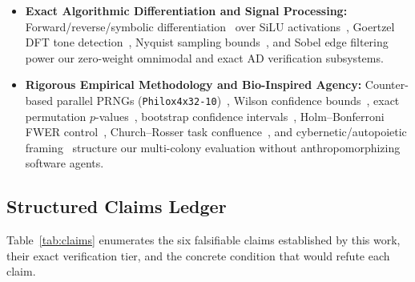 \documentclass[11pt,letterpaper]{amsart}
\newcommand{\code}[1]{{\small\texttt{#1}}}
\begin{document}
\begin{itemize}
  (\code{QGT}) and topological Chern/SSH/Kitaev
  invariants~\cite{provost1980riemannian,qi2006topological,su1979solitons,kitaev2001unpaired},
  spherical-harmonic Uns\"old identities~\cite{unsold1927beitraege}, physics-informed
  networks~\cite{raissi2019pinn}, Fibonacci anyon braiding~\cite{nayak2008nonabelian},
  spintronic $p$-bit Ising hardware models~\cite{camsari2017stochastic}, and
  QUBO simulated annealing~\cite{kirkpatrick1983optimization,glover2019qubo,lucas2014ising}.
  \item \textbf{Exact Algorithmic Differentiation and Signal Processing:}
  Forward/reverse/symbolic differentiation~\cite{baydin2018automatic,griewank2008evaluating}
  over SiLU activations~\cite{elfwing2018sigmoid}, Goertzel DFT tone
  detection~\cite{goertzel1958algorithm}, Nyquist sampling
  bounds~\cite{nyquist1928certain}, and Sobel edge filtering~\cite{kanopoulos1988sobel}
  power our zero-weight omnimodal and exact AD verification subsystems.
  \item \textbf{Rigorous Empirical Methodology and Bio-Inspired Agency:}
  Counter-based parallel PRNGs (\code{Philox4x32-10})~\cite{salmon2011parallel},
  Wilson confidence bounds~\cite{wilson1927probable}, exact permutation
  $p$-values~\cite{phipson2010permutation}, bootstrap confidence
  intervals~\cite{efron1979bootstrap}, Holm--Bonferroni FWER
  control~\cite{holm1979simple}, Church--Rosser task
  confluence~\cite{church1936conversion}, and cybernetic/autopoietic
  framing~\cite{varela1974autopoiesis,levin2022tame} structure our multi-colony
  evaluation without anthropomorphizing software agents.
\end{itemize}

\subsection{Structured Claims Ledger}
Table~\ref{tab:claims} enumerates the six falsifiable claims established by this
work, their exact verification tier, and the concrete condition that would refute
each claim.
\end{document}
